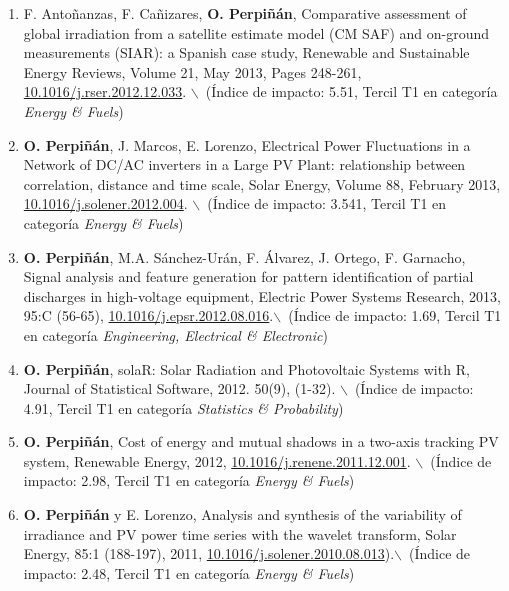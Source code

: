 \documentclass[article, a4paper]{memoir}
\begin{document}
\begin{enumerate}
\item F. Antoñanzas, F. Cañizares, \textbf{O. Perpiñán}, Comparative assessment of global irradiation from a satellite estimate model (CM SAF) and on-ground measurements (SIAR): a Spanish case study, Renewable and Sustainable Energy Reviews, Volume 21, May 2013, Pages 248-261, \href{http://dx.doi.org/10.1016/j.rser.2012.12.033}{10.1016/j.rser.2012.12.033}. $\backslash$\ (Índice de impacto: 5.51, Tercil T1 en categoría \emph{Energy \& Fuels})

\item \textbf{O. Perpiñán}, J. Marcos, E. Lorenzo, Electrical Power Fluctuations in a Network of DC/AC inverters in a Large PV Plant: relationship between correlation, distance and time scale, Solar Energy, Volume 88, February 2013, \href{http://dx.doi.org/10.1016/j.solener.2012.12.004}{10.1016/j.solener.2012.004}. $\backslash$\ (Índice de impacto: 3.541, Tercil T1 en categoría \emph{Energy \& Fuels})

\item \textbf{O. Perpiñán}, M.A. Sánchez-Urán, F. Álvarez, J. Ortego, F. Garnacho, Signal analysis and feature generation for pattern identification of partial discharges in high-voltage equipment, Electric Power Systems Research, 2013, 95:C (56-65), \href{http://dx.doi.org/10.1016/j.epsr.2012.08.016}{10.1016/j.epsr.2012.08.016}.$\backslash$\ (Índice de impacto: 1.69, Tercil T1 en categoría \emph{Engineering, Electrical \& Electronic})

\item \textbf{O. Perpiñán}, solaR: Solar Radiation and Photovoltaic Systems with R, Journal of Statistical Software, 2012. 50(9), (1-32). $\backslash$\ (Índice de impacto: 4.91, Tercil T1 en categoría \emph{Statistics \& Probability})

\item \textbf{O. Perpiñán}, Cost of energy and mutual shadows in a two-axis tracking PV system, Renewable Energy, 2012, \href{http://dx.doi.org/10.1016/j.renene.2011.12.001}{10.1016/j.renene.2011.12.001}. $\backslash$\ (Índice de impacto: 2.98, Tercil T1 en categoría \emph{Energy \& Fuels})

\item \textbf{O. Perpiñán} y E. Lorenzo, Analysis and synthesis of the variability of irradiance and PV power time series with the wavelet transform, Solar Energy, 85:1 (188-197), 2011, \href{http://dx.doi.org/10.1016/j.solener.2010.08.013}{10.1016/j.solener.2010.08.013}).$\backslash$\ (Índice de impacto: 2.48, Tercil T1 en categoría \emph{Energy \& Fuels})


\end{enumerate}
\end{document}
